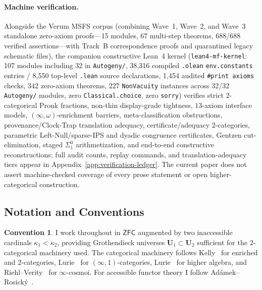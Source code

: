 \documentclass[11pt]{article}
\theoremstyle{plain}
\theoremstyle{definition}
\newtheorem{convention}[theorem]{Convention}
\newcommand{\ZFC}{\mathsf{ZFC}}
\begin{document}
\paragraph{Machine verification.} Alongside the Verum MSFS corpus (combining Wave~1, Wave~2, and Wave~3 standalone zero-axiom proofs---15 modules, 67 multi-step theorems, 688/688 verified assertions---with Track~B correspondence proofs and quarantined legacy schematic files), the companion constructive Lean~4 kernel (\texttt{lean4-mf-kernel}: 107 modules including 32 in \texttt{Autogeny/}, 38{,}316 compiled \texttt{.olean} \texttt{env.constants} entries / 8{,}550 top-level \texttt{.lean} source declarations, 1{,}454 audited \texttt{\#print axioms} checks, 342 zero-axiom theorems, 227 \texttt{NonVacuity} instances across 32/32 \texttt{Autogeny/} modules, zero \texttt{Classical.choice}, zero \texttt{sorry}) verifies strict $2$-categorical Pronk fractions, non-thin display-grade tightness, $13$-axiom interface models, $(\infty,\omega)$-enrichment barriers, meta-classification obstructions, provenance/Clock-Trap translation adequacy, certificate/adequacy $2$-categories, parametric Left-Null/sparse-\textup{IPS} and dyadic congruence certificates, Gentzen cut-elimination, staged $\Sigma^0_1$ arithmetization, and end-to-end constructive reconstructions; full audit counts, replay commands, and translation-adequacy tiers appear in Appendix~\ref{app:verification-ledger}. The current paper does not assert machine-checked coverage of every prose statement or open higher-categorical construction.

\subsection{Notation and Conventions}

\begin{convention}\label{conv:zfc-inacc}
I work throughout in $\ZFC$ augmented by two inaccessible cardinals $\kappa_1 < \kappa_2$, providing Grothendieck universes $\mathbf{U}_1 \subset \mathbf{U}_2$ sufficient for the $2$-categorical machinery used. The categorical machinery follows Kelly~\cite{Kelly1982} for enriched and $2$-categories, Lurie~\cite{LurieHTT} for $(\infty, 1)$-categories, Lurie~\cite{LurieHA} for higher algebra, and Riehl--Verity~\cite{RiehlVerity2022} for $\infty$-cosmoi. For accessible functor theory I follow Ad\'amek--Rosick\'y~\cite{AdamekRosicky1994}.
\end{convention}
\end{document}
